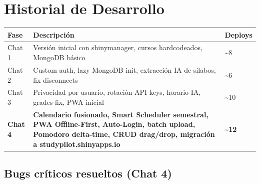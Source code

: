 \documentclass[
  spanish,
  11pt,
  a4paper,
]{article}
\newcounter{none} %
\begin{document}
\section{Historial de Desarrollo}\label{historial-de-desarrollo}

{\def\LTcaptype{none} %
\begin{longtable}[]{@{}
  >{\raggedright\arraybackslash}p{}
  >{\raggedright\arraybackslash}p{}
  >{\raggedright\arraybackslash}p{}@{}}
\toprule\noalign{}
\begin{minipage}[b]{\linewidth}\raggedright
Fase
\end{minipage} & \begin{minipage}[b]{\linewidth}\raggedright
Descripción
\end{minipage} & \begin{minipage}[b]{\linewidth}\raggedright
Deploys
\end{minipage} \\
\midrule\noalign{}
\endhead
\bottomrule\noalign{}
\endlastfoot
Chat 1 & Versión inicial con shinymanager, cursos hardcodeados, MongoDB
básico & \textasciitilde8 \\
Chat 2 & Custom auth, lazy MongoDB init, extracción IA de sílabos, fix
disconnects & \textasciitilde6 \\
Chat 3 & Privacidad por usuario, rotación API keys, horario IA, grades
fix, PWA inicial & \textasciitilde10 \\
\textbf{Chat 4} & \textbf{Calendario fusionado, Smart Scheduler
semestral, PWA Offline-First, Auto-Login, batch upload, Pomodoro
delta-time, CRUD drag/drop, migración a studypilot.shinyapps.io} &
\textbf{\textasciitilde12} \\
\end{longtable}
}

\subsection{Bugs críticos resueltos (Chat
4)}\label{bugs-cruxedticos-resueltos-chat-4}
\end{document}
